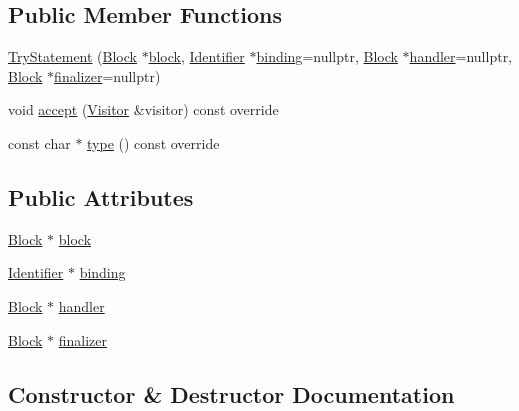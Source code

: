\subsection*{Public Member Functions}
\begin{DoxyCompactItemize}
\item 
\hyperlink{struct_try_statement_aeb83658193f1d21d40a47797deb1942e}{Try\+Statement} (\hyperlink{struct_block}{Block} $\ast$\hyperlink{struct_try_statement_aeea1fa5fce0062d0f8d427d4706d1f73}{block}, \hyperlink{struct_identifier}{Identifier} $\ast$\hyperlink{struct_try_statement_aa34bf615eed7785f87cd063a562ad8c7}{binding}=nullptr, \hyperlink{struct_block}{Block} $\ast$\hyperlink{struct_try_statement_a4d97ad90948102f8e6dca2051f03ceb0}{handler}=nullptr, \hyperlink{struct_block}{Block} $\ast$\hyperlink{struct_try_statement_a95cbb6dbd527aad85fa40f0b8b98b66c}{finalizer}=nullptr)
\item 
void \hyperlink{struct_try_statement_af223e8205727843aa77651caeb89b805}{accept} (\hyperlink{struct_visitor}{Visitor} \&visitor) const override
\item 
const char $\ast$ \hyperlink{struct_try_statement_a1113af03994575c6d5c0f814642f4503}{type} () const override
\end{DoxyCompactItemize}
\subsection*{Public Attributes}
\begin{DoxyCompactItemize}
\item 
\hyperlink{struct_block}{Block} $\ast$ \hyperlink{struct_try_statement_aeea1fa5fce0062d0f8d427d4706d1f73}{block}
\item 
\hyperlink{struct_identifier}{Identifier} $\ast$ \hyperlink{struct_try_statement_aa34bf615eed7785f87cd063a562ad8c7}{binding}
\item 
\hyperlink{struct_block}{Block} $\ast$ \hyperlink{struct_try_statement_a4d97ad90948102f8e6dca2051f03ceb0}{handler}
\item 
\hyperlink{struct_block}{Block} $\ast$ \hyperlink{struct_try_statement_a95cbb6dbd527aad85fa40f0b8b98b66c}{finalizer}
\end{DoxyCompactItemize}


\subsection{Constructor \& Destructor Documentation}
\mbox{\label{struct_try_statement_aeb83658193f1d21d40a47797deb1942e}} 
